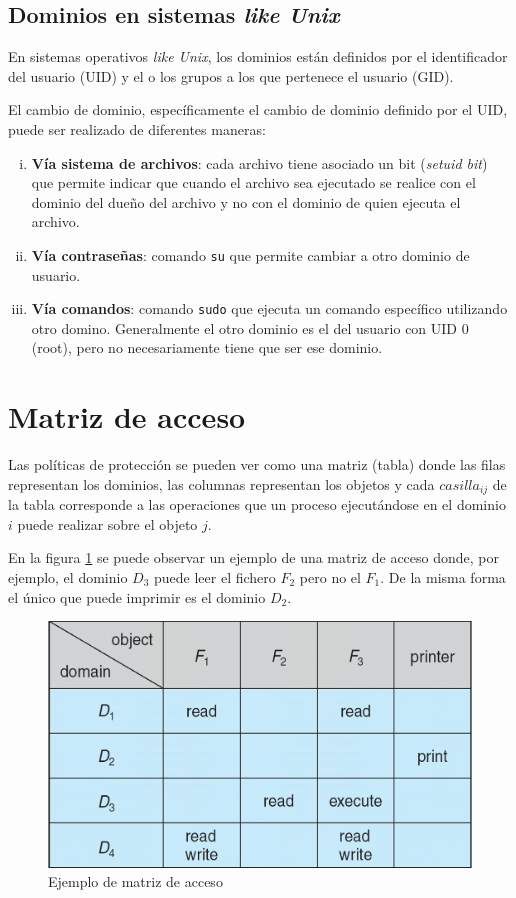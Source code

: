 \subsection{Dominios en sistemas \textit{like Unix}}
En sistemas operativos \textit{like Unix}, los dominios están definidos por el
identificador del usuario (UID) y el o los grupos a los que pertenece el usuario
(GID).

El cambio de dominio, específicamente el cambio de dominio definido por el UID,
puede ser realizado de diferentes maneras:
\begin{enumerate}[i.]

\item \textbf{Vía sistema de archivos}: cada archivo tiene asociado un bit
(\textit{setuid bit}) que permite indicar que cuando el archivo sea ejecutado se
realice con el dominio del dueño del archivo y no con el dominio de quien
ejecuta el archivo.

\item \textbf{Vía contraseñas}: comando \texttt{su} que permite cambiar a otro
dominio de usuario.

\item \textbf{Vía comandos}: comando \texttt{sudo} que ejecuta un comando
específico utilizando otro domino. Generalmente el otro dominio es el del
usuario con UID 0 (root), pero no necesariamente tiene que ser ese dominio.

\end{enumerate}

\section{Matriz de acceso}
Las políticas de protección se pueden ver como una matriz (tabla) donde las
filas representan los dominios, las columnas representan los objetos y cada
$casilla_{ij}$ de la tabla corresponde a las operaciones que un proceso
ejecutándose en el dominio $i$ puede realizar sobre el objeto $j$.

En la figura \ref{fig:matriz_acceso} se puede observar un ejemplo de una matriz
de acceso donde, por ejemplo, el dominio $D_3$ puede leer el fichero $F_2$ pero
no el $F_1$. De la misma forma el único que puede imprimir es el dominio $D_2$.

\begin{figure}[htbp]
\centering
\includegraphics[scale=0.5]{img/C09_proteccion/matriz_acceso.png}
\caption{Ejemplo de matriz de acceso}
\label{fig:matriz_acceso}
\end{figure}

